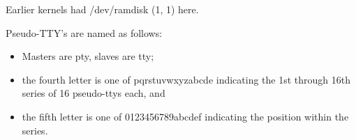 \noindent
Earlier kernels had /dev/ramdisk (1, 1) here.

\begin{devicelist}
	\minordots
\end{devicelist}

\noindent
Pseudo-TTY's are named as follows:
\begin{itemize}
\item Masters are {\file pty}, slaves are {\file tty};
\item the fourth letter is one of {\file pqrstuvwxyzabcde} indicating
the 1st through 16th series of 16 pseudo-ttys each, and
\item the fifth letter is one of {\file 0123456789abcdef} indicating
the position within the series.
\end{itemize}

